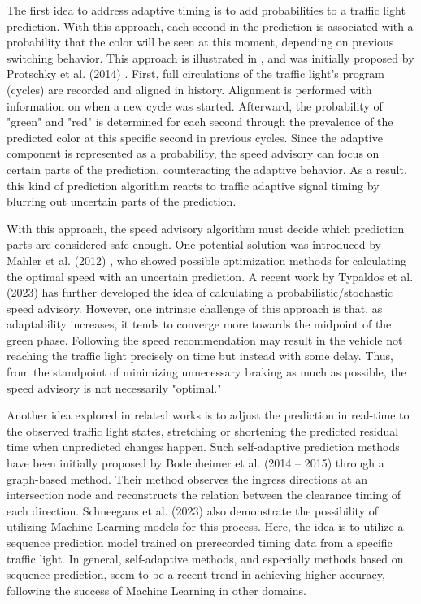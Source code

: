 The first idea to address adaptive timing is to add probabilities to a traffic light prediction. With this approach, each second in the prediction is associated with a probability that the color will be seen at this moment, depending on previous switching behavior. This approach is illustrated in , and was initially proposed by Protschky et al. (2014) \cite{protschky_extensive_2014, protschky_adaptive_2014}. First, full circulations of the traffic light's program (cycles) are recorded and aligned in history. Alignment is performed with information on when a new cycle was started. Afterward, the probability of "green" and "red" is determined for each second through the prevalence of the predicted color at this specific second in previous cycles. Since the adaptive component is represented as a probability, the speed advisory can focus on certain parts of the prediction, counteracting the adaptive behavior. As a result, this kind of prediction algorithm reacts to traffic adaptive signal timing by blurring out uncertain parts of the prediction. 

With this approach, the speed advisory algorithm must decide which prediction parts are considered safe enough. One potential solution was introduced by Mahler et al. (2012) \cite{mahler_reducing_2012}, who showed possible optimization methods for calculating the optimal speed with an uncertain prediction. A recent work by Typaldos et al. (2023) \cite{typaldos_modified_2023} has further developed the idea of calculating a probabilistic/stochastic speed advisory. However, one intrinsic challenge of this approach is that, as adaptability increases, it tends to converge more towards the midpoint of the green phase. Following the speed recommendation may result in the vehicle not reaching the traffic light precisely on time but instead with some delay. Thus, from the standpoint of minimizing unnecessary braking as much as possible, the speed advisory is not necessarily "optimal."

Another idea explored in related works is to adjust the prediction in real-time to the observed traffic light states, stretching or shortening the predicted residual time when unpredicted changes happen. Such self-adaptive prediction methods have been initially proposed by Bodenheimer et al. (2014 -- 2015) \cite{bodenheimer_enabling_2014, bodenheimer_glosa_2015} through a graph-based method. Their method observes the ingress directions at an intersection node and reconstructs the relation between the clearance timing of each direction. Schneegans et al. (2023) \cite{schneegans_prediction_2023} also demonstrate the possibility of utilizing Machine Learning models for this process. Here, the idea is to utilize a sequence prediction model trained on prerecorded timing data from a specific traffic light. In general, self-adaptive methods, and especially methods based on sequence prediction, seem to be a recent trend in achieving higher accuracy, following the success of Machine Learning in other domains.

